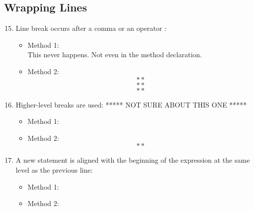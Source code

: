 \subsection{Wrapping Lines}
\begin{enumerate}
	\setcounter{enumi}{14}
	\item Line break occurs after a comma or an operator :
	\begin{itemize}
		\item Method 1: \xmark \\
		This never happens. Not even in the method declaration.
		\item Method 2: \xmark\\
		$$**$$
		$$**$$
		$$**$$
	\end{itemize}
	\item Higher-level breaks are used: ***** NOT SURE ABOUT THIS ONE *****
	\begin{itemize}
		\item Method 1:
		\item Method 2: \xmark\\
		$$**$$
	\end{itemize}
	\item A new statement is aligned with the beginning of the expression at the same level as the previous line:
	\begin{itemize}
		\item Method 1: \cmark
		\item Method 2: \cmark
	\end{itemize}
\end{enumerate}